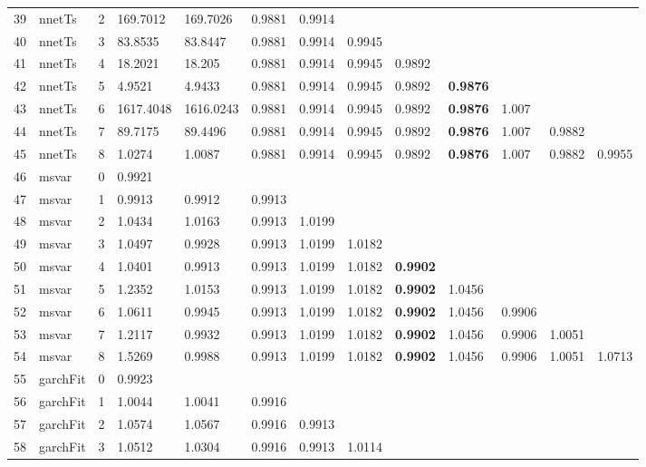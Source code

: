 \documentclass[10pt,a4paper]{article}
\begin{document}
\begin{table}[ht]
\begin{tabular}{rlrllllllllll}
  39 & nnetTs &     2 & 169.7012 & 169.7026 & 0.9881 & 0.9914 &  &  &  &  &  &  \\ 
  40 & nnetTs &     3 & 83.8535 & 83.8447 & 0.9881 & 0.9914 & 0.9945 &  &  &  &  &  \\ 
  41 & nnetTs &     4 & 18.2021 & 18.205 & 0.9881 & 0.9914 & 0.9945 & 0.9892 &  &  &  &  \\ 
  42 & nnetTs &     5 & 4.9521 & 4.9433 & 0.9881 & 0.9914 & 0.9945 & 0.9892 & \textbf{0.9876} &  &  &  \\ 
  43 & nnetTs &     6 & 1617.4048 & 1616.0243 & 0.9881 & 0.9914 & 0.9945 & 0.9892 & \textbf{0.9876} & 1.007 &  &  \\ 
  44 & nnetTs &     7 & 89.7175 & 89.4496 & 0.9881 & 0.9914 & 0.9945 & 0.9892 & \textbf{0.9876} & 1.007 & 0.9882 &  \\ 
  45 & nnetTs &     8 & 1.0274 & 1.0087 & 0.9881 & 0.9914 & 0.9945 & 0.9892 & \textbf{0.9876} & 1.007 & 0.9882 & 0.9955 \\ 
   \hline
46 & msvar &     0 & 0.9921 &  &  &  &  &  &  &  &  &  \\ 
  47 & msvar &     1 & 0.9913 & 0.9912 & 0.9913 &  &  &  &  &  &  &  \\ 
  48 & msvar &     2 & 1.0434 & 1.0163 & 0.9913 & 1.0199 &  &  &  &  &  &  \\ 
  49 & msvar &     3 & 1.0497 & 0.9928 & 0.9913 & 1.0199 & 1.0182 &  &  &  &  &  \\ 
  50 & msvar &     4 & 1.0401 & 0.9913 & 0.9913 & 1.0199 & 1.0182 & \textbf{0.9902} &  &  &  &  \\ 
  51 & msvar &     5 & 1.2352 & 1.0153 & 0.9913 & 1.0199 & 1.0182 & \textbf{0.9902} & 1.0456 &  &  &  \\ 
  52 & msvar &     6 & 1.0611 & 0.9945 & 0.9913 & 1.0199 & 1.0182 & \textbf{0.9902} & 1.0456 & 0.9906 &  &  \\ 
  53 & msvar &     7 & 1.2117 & 0.9932 & 0.9913 & 1.0199 & 1.0182 & \textbf{0.9902} & 1.0456 & 0.9906 & 1.0051 &  \\ 
  54 & msvar &     8 & 1.5269 & 0.9988 & 0.9913 & 1.0199 & 1.0182 & \textbf{0.9902} & 1.0456 & 0.9906 & 1.0051 & 1.0713 \\ 
   \hline
55 & garchFit &     0 & 0.9923 &  &  &  &  &  &  &  &  &  \\ 
  56 & garchFit &     1 & 1.0044 & 1.0041 & 0.9916 &  &  &  &  &  &  &  \\ 
  57 & garchFit &     2 & 1.0574 & 1.0567 & 0.9916 & 0.9913 &  &  &  &  &  &  \\ 
  58 & garchFit &     3 & 1.0512 & 1.0304 & 0.9916 & 0.9913 & 1.0114 &  &  &  &  &  \\ 

\end{tabular}
\end{table}
\end{document}
